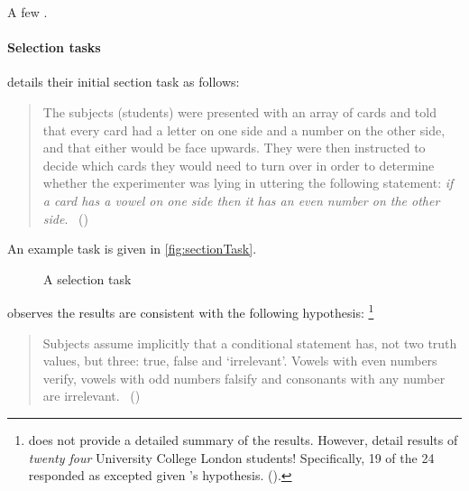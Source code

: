 \begin{note}
  A few .
\end{note}


\paragraph*{Selection tasks}
\nocite{Wason:1968aa}
\nocite{Wason:1971aa}
\label{par:selection-tasks}

\begin{note}
  \citeauthor{Wason:1966aa} details their initial section task as follows:

  \begin{quote}
    The subjects (students) were presented with an array of cards and told that every card had a letter on one side and a number on the other side, and that either would be face upwards.
    They were then instructed to decide which cards they would need to turn over in order to determine whether the experimenter was lying in uttering the following statement:
    \emph{if a card has a vowel on one side then it has an even number on the other side}.%
    \mbox{ }\hfill\mbox{(\citeyear[145--146]{Wason:1966aa})}
  \end{quote}

  An example task is given in \autoref{fig:sectionTask}.

  \begin{figure}[H]
    \centering
    \caption{A selection task}
    \label{fig:sectionTask}
  \end{figure}

  \citeauthor{Wason:1966aa} observes the results are consistent with the following hypothesis:%
  \footnote{
    \citeauthor{Wason:1966aa} does not provide a detailed summary of the results.
    However, \citeauthor{Johnson-Laird:1969aa} detail results of \emph{twenty four} University College London students!
    Specifically, 19 of the 24 responded as excepted given \citeauthor{Wason:1966aa}'s hypothesis.
    (\citeyear[369--370]{Johnson-Laird:1969aa}).
  }
  \begin{quote}
    Subjects assume implicitly that a conditional statement has, not two truth values, but three: true, false and `irrelevant'.
    Vowels with even numbers verify, vowels with odd numbers falsify and consonants with any number are irrelevant.%
    \mbox{ }\hfill\mbox{(\citeyear[146]{Wason:1966aa})}
  \end{quote}
\end{note}

